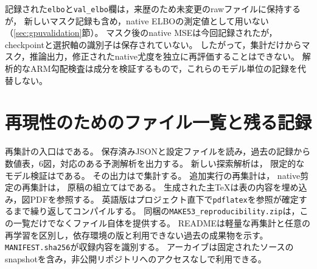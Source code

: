 \documentclass[11pt,a4paper]{ltjsarticle}
\begin{document}
記録された\texttt{elbo}と\texttt{val\_elbo}欄は，来歴のため未変更のrawファイルに保持するが，
新しいマスク記録も含め，native ELBOの測定値として用いない（\ref{sec:gpuvalidation}節）。
マスク後のnative MSEは今回記録されたが，checkpointと選択軸の識別子は保存されていない。
したがって，集計だけからマスク，推論出力，修正されたnative尤度を独立に再評価することはできない。
解析的なARM勾配検査は成分を検証するもので，これらのモデル単位の記録を代替しない。

\section{再現性のためのファイル一覧と残る記録}\label{app:inventory}
再集計の入口はである。
保存済みJSONと設定ファイルを読み，過去の記録から数値表，6図，対応のある予測解析を出力する。
新しい探索解析は，
限定的なモデル検証はである。
その出力はで集計する。
追加実行の再集計は，
native剪定の再集計は，
原稿の組立てはである。
生成された主TeXは表の内容を埋め込み，図PDFを参照する。
英語版はプロジェクト直下で\texttt{pdflatex}を参照が確定するまで繰り返してコンパイルする。
同梱の\texttt{MAKE53\_reproducibility.zip}は，この一覧だけでなくファイル自体を提供する。
READMEは軽量な再集計と任意の再学習を区別し，依存環境の版と利用できない過去の成果物を示す。
\texttt{MANIFEST.sha256}が収録内容を識別する。
アーカイブは固定されたソースのsnapshotを含み，非公開リポジトリへのアクセスなしで利用できる。
\end{document}
